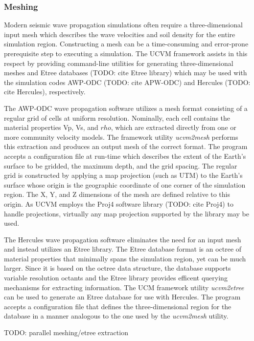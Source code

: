 \subsubsection{Meshing}
Modern seismic wave propagation simulations often require a three-dimensional input mesh which describes the wave velocities and soil density for the entire simulation region. Constructing a mesh can be a time-consuming and error-prone prerequisite step to executing a simulation. The UCVM framework assists in this respect by providing command-line utilities for generating three-dimensional meshes and Etree databases (TODO: cite Etree library) which may be used with the simulation codes AWP-ODC (TODO: cite APW-ODC) and Hercules (TODO: cite Hercules), respectively.

The AWP-ODC wave propagation software utilizes a mesh format consisting of a regular grid of cells at uniform resolution. Nominally, each cell contains the material properties Vp, Vs, and $rho$, which are extracted directly from one or more community velocity models. The framework utility \emph{ucvm2mesh} performs this extraction and produces an output mesh of the correct format. The program accepts a configuration file at run-time which describes the extent of the Earth's surface to be gridded, the maximum depth, and the grid spacing. The regular grid is constructed by applying a map projection (such as UTM) to the Earth's surface whose origin is the geographic coordinate of one corner of the simulation region. The X, Y, and Z dimensions of the mesh are defined relative to this origin. As UCVM employs the Proj4 software library (TODO: cite Proj4) to handle projections, virtually any map projection supported by the library may be used.

The Hercules wave propagation software eliminates the need for an input mesh and instead utilizes an Etree library. The Etree database format is an octree of material properties that minimally spans the simulation region, yet can be much larger. Since it is based on the octree data structure, the database supports variable resolution octants and the Etree library provides efficent querying mechanisms for extracting information. The UCM framework utility \emph{ucvm2etree} can be used to generate an Etree database for use with Hercules. The program accepts a configuration file that defines the three-dimensional region for the database in a manner analogous to the one used by the \emph{ucvm2mesh} utility.

TODO: parallel meshing/etree extraction

